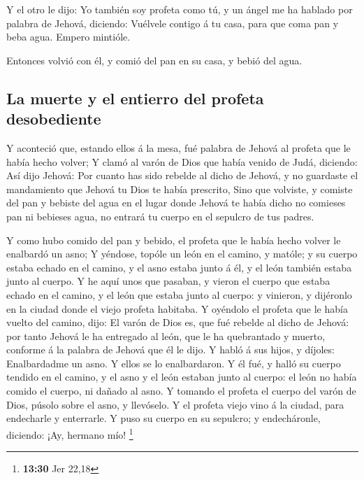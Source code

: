  Y el otro le dijo: Yo también soy profeta como tú, y un
ángel me ha hablado por palabra de Jehová, diciendo: Vuélvele contigo á
tu casa, para que coma pan y beba agua. Empero mintióle.

 Entonces volvió con él, y comió del pan en su casa, y
bebió del agua.

\hypertarget{la-muerte-y-el-entierro-del-profeta-desobediente}{%
\subsection{La muerte y el entierro del profeta
desobediente}\label{la-muerte-y-el-entierro-del-profeta-desobediente}}

 Y aconteció que, estando ellos á la mesa, fué palabra de
Jehová al profeta que le había hecho volver;  Y clamó al
varón de Dios que había venido de Judá, diciendo: Así dijo Jehová: Por
cuanto has sido rebelde al dicho de Jehová, y no guardaste el
mandamiento que Jehová tu Dios te había prescrito,  Sino
que volviste, y comiste del pan y bebiste del agua en el lugar donde
Jehová te había dicho no comieses pan ni bebieses agua, no entrará tu
cuerpo en el sepulcro de tus padres.

 Y como hubo comido del pan y bebido, el profeta que le
había hecho volver le enalbardó un asno;  Y yéndose,
topóle un león en el camino, y matóle; y su cuerpo estaba echado en el
camino, y el asno estaba junto á él, y el león también estaba junto al
cuerpo.  Y he aquí unos que pasaban, y vieron el cuerpo
que estaba echado en el camino, y el león que estaba junto al cuerpo: y
vinieron, y dijéronlo en la ciudad donde el viejo profeta habitaba.
 Y oyéndolo el profeta que le había vuelto del camino,
dijo: El varón de Dios es, que fué rebelde al dicho de Jehová: por tanto
Jehová le ha entregado al león, que le ha quebrantado y muerto, conforme
á la palabra de Jehová que él le dijo.  Y habló á sus
hijos, y díjoles: Enalbardadme un asno. Y ellos se lo enalbardaron.
 Y él fué, y halló su cuerpo tendido en el camino, y el
asno y el león estaban junto al cuerpo: el león no había comido el
cuerpo, ni dañado al asno.  Y tomando el profeta el
cuerpo del varón de Dios, púsolo sobre el asno, y llevóselo. Y el
profeta viejo vino á la ciudad, para endecharle y enterrarle.
 Y puso su cuerpo en su sepulcro; y endecháronle,
diciendo: ¡Ay, hermano mío! \footnote{\textbf{13:30} Jer 22,18}

